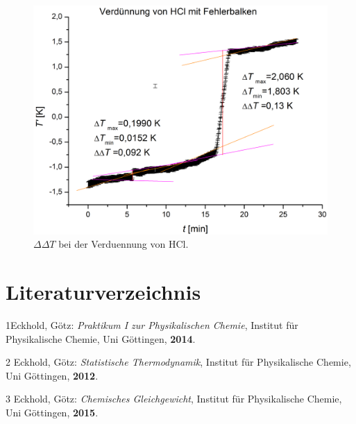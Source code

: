 \documentclass[12pt,a4paper,titlepage,headinclude,bibtotoc]{scrartcl}
\begin{document}
\begin{figure}[h] \label{HCLVerduennungFehlerbalken}
\centering
\includegraphics[width=13.5cm]{HClVerduennungFehlerbalken.png}
\caption{$\Delta \Delta T$ bei der Verduennung von HCl.}
\end{figure} 
\FloatBarrier


\section{Literaturverzeichnis}
1\quad Eckhold, Götz: \emph{Praktikum I zur Physikalischen Chemie}, Institut für Physikalische Chemie, Uni Göttingen, \textbf{2014}.
\vspace{0,5 cm}

2 \quad Eckhold, Götz: \emph{Statistische Thermodynamik}, Institut für Physikalische Chemie, Uni Göttingen, \textbf{2012}.

\vspace{0,5cm}

3 \quad Eckhold, Götz: \emph{Chemisches Gleichgewicht}, Institut für Physikalische Chemie, Uni Göttingen, \textbf{2015}.\\
\end{document}
